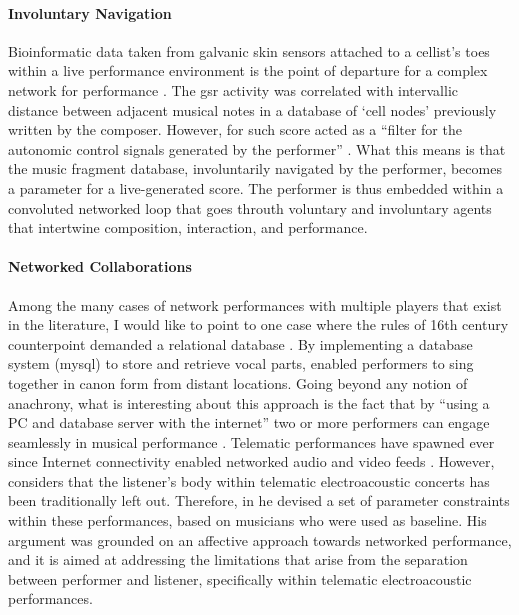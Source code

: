 {	\paragraph{Involuntary Navigation}
	Bioinformatic data taken from galvanic skin sensors attached to a cellist's toes within a live performance environment is the point of departure for a complex network for performance \parencite{icmc/bbp2372.2006.123}. The \gls{gsr} activity was correlated with intervallic distance between adjacent musical notes in a database of `cell nodes' previously written by the composer. However, for \citeauthor{icmc/bbp2372.2006.123} such score acted as a ``filter for the autonomic control signals generated by the performer'' \parencite[601]{icmc/bbp2372.2006.123}. What this means is that the music fragment database, involuntarily navigated by the performer, becomes a parameter for a live-generated score. The performer is thus embedded within a convoluted networked loop that goes throuth voluntary and involuntary agents that intertwine composition, interaction, and performance.

	\paragraph{Networked Collaborations}
	Among the many cases of network performances with multiple players that exist in the literature, I would like to point to one case where the rules of 16th century counterpoint demanded a relational database \parencite{Nakamoto2007}. By implementing a database system (\gls{mysql}) to store and retrieve vocal parts, \citeauthor{Nakamoto2007} enabled performers to sing together in canon form from distant locations. Going beyond any notion of anachrony, what is interesting about this approach is the fact that by ``using a PC and database server with the internet'' two or more performers can engage seamlessly in musical performance \parencite{Nakamoto2007}. Telematic performances have spawned ever since Internet connectivity enabled networked audio and video feeds \parencite{icmc/bbp2372.2014.046}. However, \citeauthor{icmc/bbp2372.2014.046} considers that the listener's body within telematic electroacoustic concerts has been traditionally left out. Therefore, in he devised a set of parameter constraints within these performances, based on musicians who were used as baseline. His argument was grounded on an affective approach towards networked performance, and it is aimed at addressing the limitations that arise from the separation between performer and listener, specifically within telematic electroacoustic performances.

}
